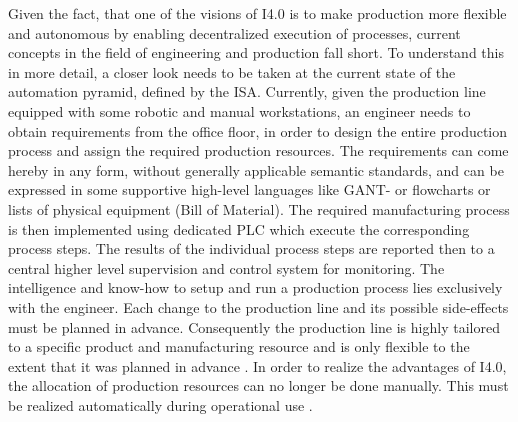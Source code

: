 Given the fact, that one of the visions of \ac{I4.0} is to make production more flexible and autonomous by enabling decentralized execution of processes, current concepts in the field of engineering and production fall short. To understand this in more detail, a closer look needs to be taken at the current state of the automation pyramid, defined by the \ac{ISA}. Currently, given the production line equipped with some robotic and manual workstations, an engineer needs to obtain requirements from the office floor, in order to design the entire production process and assign the required production resources. The requirements can come hereby in any form, without generally applicable semantic standards, and can be expressed in some supportive high-level languages like GANT- or flowcharts or lists of physical equipment (Bill of Material). The required manufacturing process is then implemented using dedicated \ac{PLC} which execute the corresponding process steps. The results of the individual process steps are reported then to a central higher level supervision and control system for monitoring. The intelligence and know-how to setup and run a production process lies exclusively with the engineer. Each change to the production line and its possible side-effects must be planned in advance. Consequently the production line is highly tailored to a specific product and manufacturing resource and is only flexible to the extent that it was planned in advance \cite[p.1]{Keddis2015Capability-basedSystems}. In order to realize the advantages of \ac{I4.0}, the allocation of production resources can no longer be done manually. This must be realized automatically during operational use \cite[p. 9]{Bock2016Weiterentwicklung4.0-Komponenten}.

